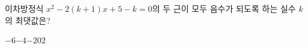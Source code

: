 \hspace*{2mm}\begin{minipage}[t]{\dimexpr\linewidth-2mm\relax}\vspace{0pt}
이차방정식 $x^2-2(k+1)x+5-k=0$의 두 근이 모두 음수가 되도록 하는 실수 $k$의 최댓값은?
\begin{choices32}{$-6$}{$-4$}{$-2$}{$0$}{$2$}\end{choices32}\end{minipage}
